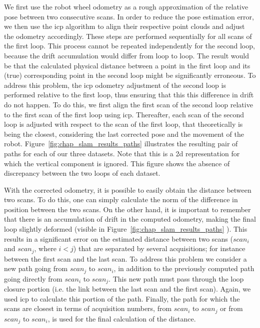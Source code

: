 We first use the robot wheel odometry as a rough approximation of the relative pose between two consecutive scans. In order to reduce the pose estimation error, we then use the \gls*{icp} algorithm to align their respective point clouds and adjust the odometry accordingly. These steps are performed sequentially for all scans of the first loop. This process cannot be repeated independently for the second loop, because the drift accumulation would differ from loop to loop. The result would be that the calculated physical distance between a point in the first loop and its (true) corresponding point in the second loop might be significantly erroneous. To address this problem, the \gls*{icp} odometry adjustment of the second loop is performed relative to the first loop, thus ensuring that this this difference in drift do not happen. To do this, we first align the first scan of the second loop relative to the first scan of the first loop using \gls*{icp}. Thereafter, each scan of the second loop is adjusted with respect to the scan of the first loop, that theoretically is being the closest, considering the last corrected pose and the movement of the robot. Figure~\ref{fig:chap_slam_results_paths} illustrates the resulting pair of paths for each of our three datasets. Note that this is a \gls*{2d} representation for which the vertical component is ignored. This figure shows the absence of discrepancy between the two loops of each dataset.

With the corrected odometry, it is possible to easily obtain the distance between two scans. To do this, one can simply calculate the norm of the difference in position between the two scans. On the other hand, it is important to remember that there is an accumulation of drift in the computed odometry, making the final loop slightly deformed (visible in Figure~\ref{fig:chap_slam_results_paths} \protect{} \protect{}). This results in a significant error on the estimated distance between two scans ($scan_i$ and $scan_j$, where $i<j$) that are separated by several acquisitions; for instance between the first scan and the last scan. To address this problem we consider a new path going from $scan_j$ to $scan_i$, in addition to the previously computed path going directly from $scan_i$ to $scan_j$. This new path must pass through the loop closure portion (i.e. the link between the last scan and the first scan). Again, we used \gls*{icp} to calculate this portion of the path. Finally, the path for which the scans are closest in terms of acquisition numbers, from $scan_i$ to $scan_j$ or from $scan_j$ to $scan_i$, is used for the final calculation of the distance.

